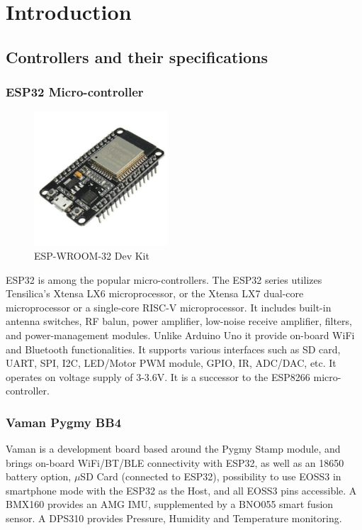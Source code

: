 \chapter{Introduction} \label{chap:intro}

\section{Controllers and their specifications}

\subsection{ESP32 Micro-controller}

\begin{figure}[h!]
\centering
\includegraphics[width=5cm]{./Figures/ESP32.jpg}
\caption{ESP-WROOM-32 Dev Kit}
\label{ESP32}
\end{figure}

ESP32 is among the popular micro-controllers. The ESP32 series utilizes Tensilica's Xtensa LX6 microprocessor, or the Xtensa LX7 dual-core microprocessor or a single-core RISC-V microprocessor. It includes built-in antenna switches, RF balun, power amplifier, low-noise receive amplifier, filters, and power-management modules. Unlike Arduino Uno it provide on-board WiFi and Bluetooth functionalities. It supports various interfaces such as SD card, UART, SPI, I2C, LED/Motor PWM module, GPIO, IR, ADC/DAC, etc. It operates on voltage supply of 3-3.6V. It is a successor to the ESP8266 micro-controller.

\subsection{Vaman Pygmy BB4} 
\par Vaman is a development board based around the Pygmy Stamp module, and brings on-board WiFi/BT/BLE connectivity with ESP32, as well as an 18650 battery option, $\mu$SD Card (connected to ESP32), possibility to use EOSS3 in smartphone mode with the ESP32 as the Host, and all EOSS3 pins accessible. A BMX160 provides an AMG IMU, supplemented by a BNO055 smart fusion sensor. A DPS310 provides Pressure, Humidity and Temperature monitoring.

